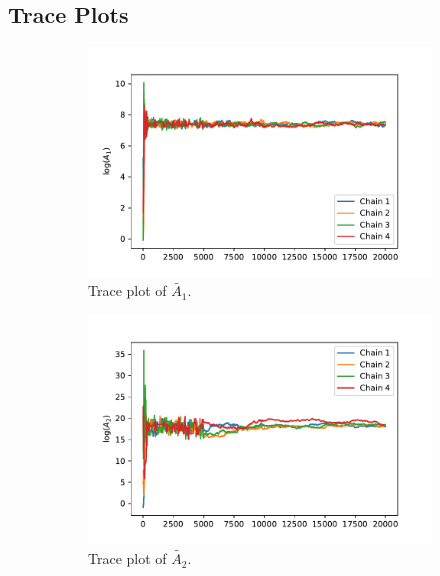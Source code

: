 \subsection{Trace Plots}
\begin{figure}[h!]
\centering
\begin{subfigure}{0.5\textwidth}
\centering
\includegraphics[width=\linewidth]{figures/bayesian/2_reactions/mass/trace_plot_A1.pdf}
\caption{Trace plot of $\tilde{A_1}$.}
\label{traceA1}
\end{subfigure}%
\begin{subfigure}{0.5\textwidth}
\centering
\includegraphics[width=\linewidth]{figures/bayesian/2_reactions/mass/trace_plot_A2.pdf}
\caption{Trace plot of $\tilde{A_2}$.}
\label{traceA2}
\end{subfigure}
\newline
\begin{subfigure}{0.5\textwidth}

\end{subfigure}
\end{figure}
